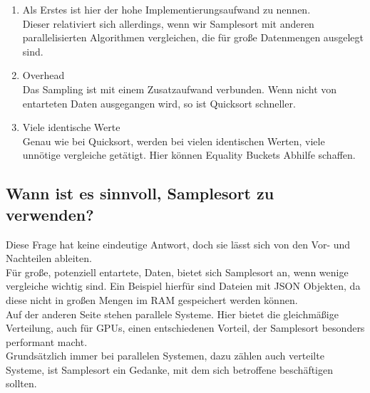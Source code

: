 		\begin{enumerate}
			\item Als Erstes ist hier der hohe Implementierungsaufwand zu nennen.\\
				Dieser relativiert sich allerdings, wenn wir Samplesort mit anderen parallelisierten Algorithmen vergleichen, die für große Datenmengen ausgelegt sind.
			\item Overhead\\
				Das Sampling ist mit einem Zusatzaufwand verbunden.
				Wenn nicht von entarteten Daten ausgegangen wird, so ist Quicksort schneller.
			\item Viele identische Werte\\
				Genau wie bei Quicksort, werden bei vielen identischen Werten, viele unnötige vergleiche getätigt.
				Hier können Equality Buckets Abhilfe schaffen.
		\end{enumerate}
		
	\subsection{Wann ist es sinnvoll, Samplesort zu verwenden?}
		Diese Frage hat keine eindeutige Antwort, doch sie lässt sich von den Vor- und Nachteilen ableiten.\\
		Für große, potenziell entartete, Daten, bietet sich Samplesort an, wenn wenige vergleiche wichtig sind.
		Ein Beispiel hierfür sind Dateien mit JSON Objekten, da diese nicht in großen Mengen im RAM gespeichert werden können.\\
		Auf der anderen Seite stehen parallele Systeme. Hier bietet die gleichmäßige Verteilung, auch für GPUs, einen entschiedenen Vorteil, der Samplesort besonders performant macht.\\
		Grundsätzlich immer bei parallelen Systemen, dazu zählen auch verteilte Systeme, ist Samplesort ein Gedanke, mit dem sich betroffene beschäftigen sollten.
